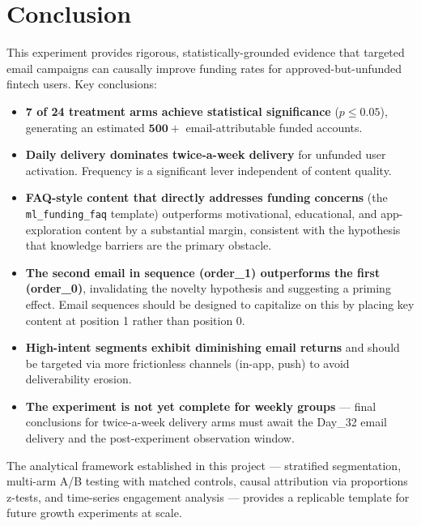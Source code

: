 \documentclass[12pt,a4paper]{article}
\begin{document}
\clearpage
\section{Conclusion}

This experiment provides rigorous, statistically-grounded evidence that targeted
email campaigns can causally improve funding rates for approved-but-unfunded fintech
users. Key conclusions:

\begin{itemize}[leftmargin=2em]
  \item \textbf{7 of 24 treatment arms achieve statistical significance} ($p \leq 0.05$),
    generating an estimated $\mathbf{500+}$ email-attributable funded accounts.

  \item \textbf{Daily delivery dominates twice-a-week delivery} for unfunded user
    activation. Frequency is a significant lever independent of content quality.

  \item \textbf{FAQ-style content that directly addresses funding concerns} (the
    \texttt{ml\_funding\_faq} template) outperforms motivational, educational, and
    app-exploration content by a substantial margin, consistent with the hypothesis
    that knowledge barriers are the primary obstacle.

  \item \textbf{The second email in sequence (order\_1) outperforms the first (order\_0)},
    invalidating the novelty hypothesis and suggesting a priming effect. Email
    sequences should be designed to capitalize on this by placing key content at
    position 1 rather than position 0.

  \item \textbf{High-intent segments exhibit diminishing email returns} and should
    be targeted via more frictionless channels (in-app, push) to avoid deliverability
    erosion.

  \item \textbf{The experiment is not yet complete for weekly groups} — final
    conclusions for twice-a-week delivery arms must await the Day\_32 email delivery
    and the post-experiment observation window.

\end{itemize}

The analytical framework established in this project — stratified segmentation,
multi-arm A/B testing with matched controls, causal attribution via proportions
z-tests, and time-series engagement analysis — provides a replicable template for
future growth experiments at scale.
\end{document}

